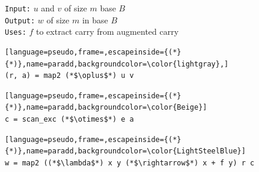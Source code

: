 \begin{figure}
  \centering
  \begin{minipage}{0.47\textwidth}
    \footnotesize
    \texttt{Input:} $u$ and $v$ of size $m$ base $B$\\
    \texttt{Output:} $w$ of size $m$ in base $B$\\
    \texttt{Uses:} $f$ to extract carry from augmented carry
\begin{lstlisting}[language=pseudo,frame=,escapeinside={(*}{*)},name=paradd,backgroundcolor=\color{lightgray},]
(r, a) = map2 (*$\oplus$*) u v
\end{lstlisting}
\vspace{-\baselineskip}
\begin{lstlisting}[language=pseudo,frame=,escapeinside={(*}{*)},name=paradd,backgroundcolor=\color{Beige}]
c = scan_exc (*$\otimes$*) e a
\end{lstlisting}
\vspace{-\baselineskip}
\begin{lstlisting}[language=pseudo,frame=,escapeinside={(*}{*)},name=paradd,backgroundcolor=\color{LightSteelBlue}]
w = map2 ((*$\lambda$*) x y (*$\rightarrow$*) x + f y) r c
\end{lstlisting}
\end{minipage}
  \noindent{}
\end{figure}
